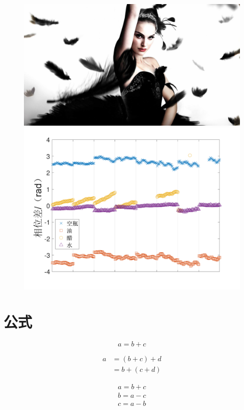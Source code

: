 \documentclass[UTF8]{ctexart}
\begin{document}
    \begin{figure}
        {\includegraphics[width=0.495\linewidth]{Swan.png}}
        {\includegraphics[width=0.495\linewidth]{headtail_phase_diff.pdf}}
    \end{figure}

    \section{公式} %
    
    \begin{equation}\label{eq:1}
        a = b + c
    \end{equation}
    
    \begin{equation}
        \begin{split}
            a &= (b + c) + d \\
            &= b + (c + d)
        \end{split}
    \end{equation}

    \begin{align}
        a = b + c\\
        b = a - c\\
        c = a - b
    \end{align}
\end{document}
